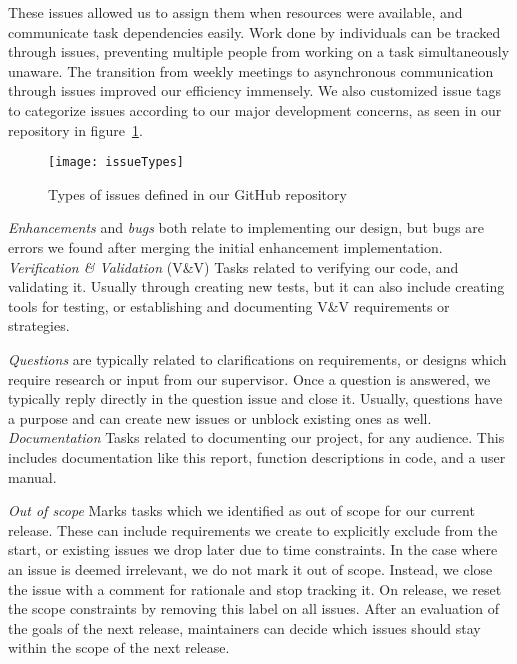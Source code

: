These issues allowed us to assign them when resources were available, and communicate task dependencies easily.
Work done by individuals can be tracked through issues,
preventing multiple people from working on a task simultaneously unaware.
The transition from weekly meetings to asynchronous communication through issues improved our efficiency immensely.
We also customized issue tags to categorize issues
according to our major development concerns, as seen in our repository in figure~\ref{fig:issueTypes}.
\begin{figure}[h]
    \centering
    \texttt{[image: issueTypes]}
    \caption{Types of issues defined in our GitHub repository}
    \label{fig:issueTypes}
\end{figure}

\textit{Enhancements} and \textit{bugs} both relate to implementing our design,
but bugs are errors we found after merging the initial enhancement implementation.
\textit{Verification \& Validation} (V\&V) Tasks related to verifying our code, and validating it.
Usually through creating new tests, but it can also include creating tools for testing,
or establishing and documenting V\&V requirements or strategies.

\textit{Questions} are typically related to clarifications on requirements,
or designs which require research or input from our supervisor.
Once a question is answered, we typically reply directly in the question issue and close it.
Usually, questions have a purpose and can create new issues or unblock existing ones as well.
\textit{Documentation} Tasks related to documenting our project, for any audience.
This includes documentation like this report, function descriptions in code, and a user manual.

\textit{Out of scope} Marks tasks which we identified as out of scope for our current release.
These can include requirements we create to explicitly exclude from the start,
or existing issues we drop later due to time constraints.
In the case where an issue is deemed irrelevant, we do not mark it out of scope.
Instead, we close the issue with a comment for rationale and stop tracking it.
On release, we reset the scope constraints by removing this label on all issues.
After an evaluation of the goals of the next release,
maintainers can decide which issues should stay within the scope of the next release.

